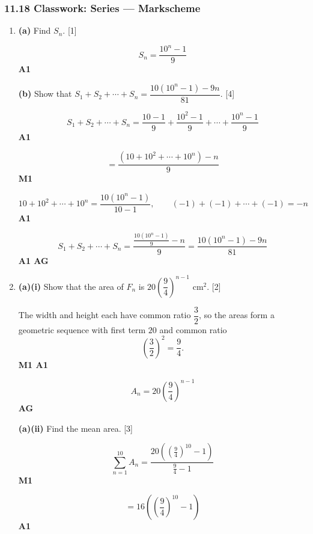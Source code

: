 \documentclass[12pt, twoside]{article}
\begin{document}
\subsubsection*{11.18 Classwork: Series --- Markscheme}

\begin{enumerate}[itemsep=0.35cm]

\item[1.] [Maximum mark: 5]

\textbf{(a)} Find $S_n$. \hfill [1]

\[
S_n=\frac{10^n-1}{9}
\]
\hfill \textbf{A1}

\medskip

\textbf{(b)} Show that
$S_1+S_2+\cdots+S_n=\dfrac{10(10^n-1)-9n}{81}$. \hfill [4]

\[
S_1+S_2+\cdots+S_n
=\frac{10-1}{9}+\frac{10^2-1}{9}+\cdots+\frac{10^n-1}{9}
\]
\hfill \textbf{A1}

\[
=\frac{(10+10^2+\cdots+10^n)-n}{9}
\]
\hfill \textbf{M1}

\[
10+10^2+\cdots+10^n=\frac{10(10^n-1)}{10-1}, \qquad
(-1)+(-1)+\cdots+(-1)=-n
\]
\hfill \textbf{A1}

\[
S_1+S_2+\cdots+S_n
=\frac{\frac{10(10^n-1)}{9}-n}{9}
=\frac{10(10^n-1)-9n}{81}
\]
\hfill \textbf{A1 AG}

\newpage

\item[2.] [Maximum mark: 8]

\textbf{(a)(i)} Show that the area of $F_n$ is
$20\left(\dfrac{9}{4}\right)^{n-1}\text{ cm}^2$. \hfill [2]

The width and height each have common ratio $\dfrac{3}{2}$, so the areas
form a geometric sequence with first term $20$ and common ratio
\[
\left(\frac{3}{2}\right)^2=\frac{9}{4}.
\]
\hfill \textbf{M1 A1}

\[
A_n=20\left(\frac{9}{4}\right)^{n-1}
\]
\hfill \textbf{AG}

\medskip

\textbf{(a)(ii)} Find the mean area. \hfill [3]

\[
\sum_{n=1}^{10} A_n
=\frac{20\left(\left(\frac{9}{4}\right)^{10}-1\right)}
{\frac{9}{4}-1}
\]
\hfill \textbf{M1}

\[
=16\left(\left(\frac{9}{4}\right)^{10}-1\right)
\]
\hfill \textbf{A1}


\end{enumerate}
\end{document}
